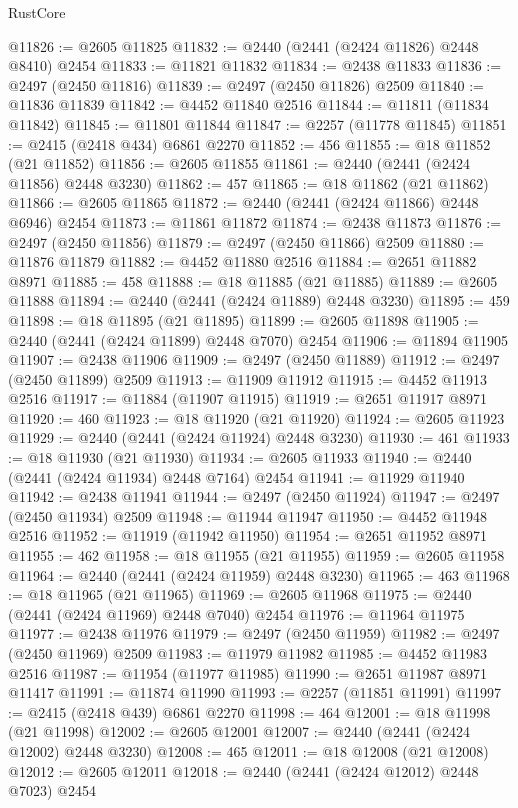 \begin{lexlean}{RustCore}
\begin{coremodule}
@11826 := @2605 @11825
@11832 := @2440 (@2441 (@2424 @11826) @2448 @8410) @2454
@11833 := @11821 @11832
@11834 := @2438 @11833
@11836 := @2497 (@2450 @11816)
@11839 := @2497 (@2450 @11826) @2509
@11840 := @11836 @11839
@11842 := @4452 @11840 @2516
@11844 := @11811 (@11834 @11842)
@11845 := @11801 @11844
@11847 := @2257 (@11778 @11845)
@11851 := @2415 (@2418 @434) @6861 @2270
@11852 := 456
@11855 := @18 @11852 (@21 @11852)
@11856 := @2605 @11855
@11861 := @2440 (@2441 (@2424 @11856) @2448 @3230)
@11862 := 457
@11865 := @18 @11862 (@21 @11862)
@11866 := @2605 @11865
@11872 := @2440 (@2441 (@2424 @11866) @2448 @6946) @2454
@11873 := @11861 @11872
@11874 := @2438 @11873
@11876 := @2497 (@2450 @11856)
@11879 := @2497 (@2450 @11866) @2509
@11880 := @11876 @11879
@11882 := @4452 @11880 @2516
@11884 := @2651 @11882 @8971
@11885 := 458
@11888 := @18 @11885 (@21 @11885)
@11889 := @2605 @11888
@11894 := @2440 (@2441 (@2424 @11889) @2448 @3230)
@11895 := 459
@11898 := @18 @11895 (@21 @11895)
@11899 := @2605 @11898
@11905 := @2440 (@2441 (@2424 @11899) @2448 @7070) @2454
@11906 := @11894 @11905
@11907 := @2438 @11906
@11909 := @2497 (@2450 @11889)
@11912 := @2497 (@2450 @11899) @2509
@11913 := @11909 @11912
@11915 := @4452 @11913 @2516
@11917 := @11884 (@11907 @11915)
@11919 := @2651 @11917 @8971
@11920 := 460
@11923 := @18 @11920 (@21 @11920)
@11924 := @2605 @11923
@11929 := @2440 (@2441 (@2424 @11924) @2448 @3230)
@11930 := 461
@11933 := @18 @11930 (@21 @11930)
@11934 := @2605 @11933
@11940 := @2440 (@2441 (@2424 @11934) @2448 @7164) @2454
@11941 := @11929 @11940
@11942 := @2438 @11941
@11944 := @2497 (@2450 @11924)
@11947 := @2497 (@2450 @11934) @2509
@11948 := @11944 @11947
@11950 := @4452 @11948 @2516
@11952 := @11919 (@11942 @11950)
@11954 := @2651 @11952 @8971
@11955 := 462
@11958 := @18 @11955 (@21 @11955)
@11959 := @2605 @11958
@11964 := @2440 (@2441 (@2424 @11959) @2448 @3230)
@11965 := 463
@11968 := @18 @11965 (@21 @11965)
@11969 := @2605 @11968
@11975 := @2440 (@2441 (@2424 @11969) @2448 @7040) @2454
@11976 := @11964 @11975
@11977 := @2438 @11976
@11979 := @2497 (@2450 @11959)
@11982 := @2497 (@2450 @11969) @2509
@11983 := @11979 @11982
@11985 := @4452 @11983 @2516
@11987 := @11954 (@11977 @11985)
@11990 := @2651 @11987 @8971 @11417
@11991 := @11874 @11990
@11993 := @2257 (@11851 @11991)
@11997 := @2415 (@2418 @439) @6861 @2270
@11998 := 464
@12001 := @18 @11998 (@21 @11998)
@12002 := @2605 @12001
@12007 := @2440 (@2441 (@2424 @12002) @2448 @3230)
@12008 := 465
@12011 := @18 @12008 (@21 @12008)
@12012 := @2605 @12011
@12018 := @2440 (@2441 (@2424 @12012) @2448 @7023) @2454

\end{coremodule}
\end{lexlean}
